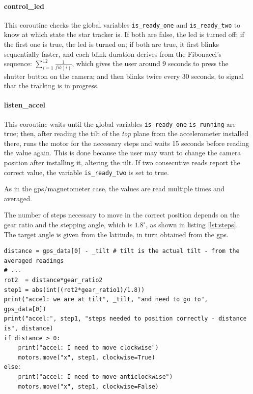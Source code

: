 \documentclass[]{article}
\begin{document}
\paragraph{control\_led} This coroutine checks the global variables \texttt{is\_ready\_one} and \texttt{is\_ready\_two} to know at which state the star tracker is. If both are false, the led is turned off; if the first one is true, the led is turned on; if both are true, it first blinks sequentially faster, and each blink duration derives from the Fibonacci's sequence: $\sum_{i=1}^{12}\frac{1}{fib(i)}$, which gives the user around 9 seconds to press the shutter button on the camera; and then blinks twice every 30 seconds, to signal that the tracking is in progress. 
\paragraph{listen\_accel} This coroutine waits until the global variables \texttt{is\_ready\_one} \texttt{is\_running} are true; then, after reading the tilt of the \textit{top} plane from the accelerometer installed there, runs the motor for the necessary steps and waits 15 seconds before reading the value again. This is done because the user may want to change the camera position after installing it, altering the tilt. If two consecutive reads report the correct value, the variable \texttt{is\_ready\_two} is set to true.

As in the gps/magnetometer case, the values are read multiple times and averaged. 

The number of steps necessary to move in the correct position depends on the gear ratio and the stepping angle, which is $1.8^\circ$, as shown in listing \ref{lst:steps}. The target angle is given from the latitude, in turn obtained from the gps. 

\begin{lstlisting}[language=PythonPlus, label={lst:steps}, caption=The computation inside \texttt{listen\_accel} to compute the steps needed to move in the correct position the \textit{top} plane.]
distance = gps_data[0] - _tilt # tilt is the actual tilt - from the averaged readings
# ...
rot2  = distance*gear_ratio2
step1 = abs(int((rot2*gear_ratio1)/1.8))
print("accel: we are at tilt", _tilt, "and need to go to", gps_data[0])
print("accel:", step1, "steps needed to position correctly - distance is", distance)
if distance > 0:
	print("accel: I need to move clockwise")
	motors.move("x", step1, clockwise=True)
else:
	print("accel: I need to move anticlockwise")
	motors.move("x", step1, clockwise=False)
\end{lstlisting}
\end{document}
